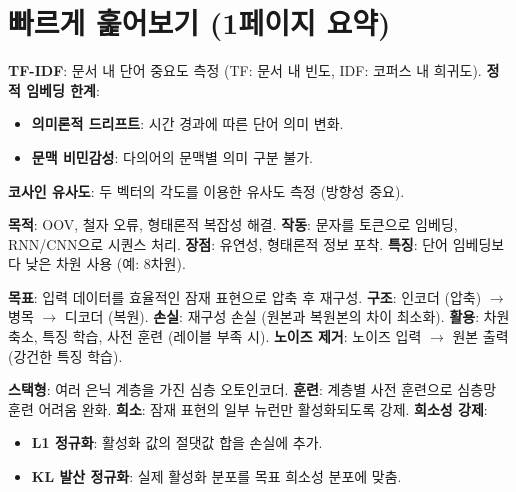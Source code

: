\documentclass[11pt,a4paper]{article}
\theoremstyle{definition}
\begin{document}
\newpage
\section{빠르게 훑어보기 (1페이지 요약)}

\begin{tcolorbox}[summary, colback=lightblue, colframe=darkblue, title=\textbf{핵심 개념 요약}]
\textbf{TF-IDF}: 문서 내 단어 중요도 측정 (TF: 문서 내 빈도, IDF: 코퍼스 내 희귀도).
\textbf{정적 임베딩 한계}:
\begin{itemize}
    \item \textbf{의미론적 드리프트}: 시간 경과에 따른 단어 의미 변화.
    \item \textbf{문맥 비민감성}: 다의어의 문맥별 의미 구분 불가.
\end{itemize}
\textbf{코사인 유사도}: 두 벡터의 각도를 이용한 유사도 측정 (방향성 중요).
\end{tcolorbox}

\begin{tcolorbox}[infobox, colback=lightgreen, colframe=darkgreen, title=\textbf{문자 임베딩}]
\textbf{목적}: OOV, 철자 오류, 형태론적 복잡성 해결.
\textbf{작동}: 문자를 토큰으로 임베딩, RNN/CNN으로 시퀀스 처리.
\textbf{장점}: 유연성, 형태론적 정보 포착.
\textbf{특징}: 단어 임베딩보다 낮은 차원 사용 (예: 8차원).
\end{tcolorbox}

\begin{tcolorbox}[warningbox, colback=lightyellow, colframe=darkorange, title=\textbf{오토인코더 (Autoencoders)}]
\textbf{목표}: 입력 데이터를 효율적인 잠재 표현으로 압축 후 재구성.
\textbf{구조}: 인코더 (압축) $\rightarrow$ 병목 $\rightarrow$ 디코더 (복원).
\textbf{손실}: 재구성 손실 (원본과 복원본의 차이 최소화).
\textbf{활용}: 차원 축소, 특징 학습, 사전 훈련 (레이블 부족 시).
\textbf{노이즈 제거}: 노이즈 입력 $\rightarrow$ 원본 출력 (강건한 특징 학습).
\end{tcolorbox}

\begin{tcolorbox}[importantbox, colback=boxred, colframe=red!70!black, title=\textbf{스택형 \& 희소 오토인코더}]
\textbf{스택형}: 여러 은닉 계층을 가진 심층 오토인코더.
\textbf{훈련}: 계층별 사전 훈련으로 심층망 훈련 어려움 완화.
\textbf{희소}: 잠재 표현의 일부 뉴런만 활성화되도록 강제.
\textbf{희소성 강제}:
\begin{itemize}
    \item \textbf{L1 정규화}: 활성화 값의 절댓값 합을 손실에 추가.
    \item \textbf{KL 발산 정규화}: 실제 활성화 분포를 목표 희소성 분포에 맞춤.
\end{itemize}
\end{tcolorbox}
\end{document}
